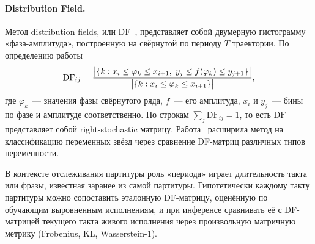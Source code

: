 \paragraph*{Distribution Field.} Метод distribution
fields, или DF~\cite{SevillaLaraDF2012}, представляет собой
двумерную гистограмму «фаза-амплитуда», построенную на
свёрнутой по периоду $T$ траектории. По определению
работы~\cite{SevillaLaraDF2012}
\begin{equation}
\mathrm{DF}_{ij} = \frac{\bigl|\{k : x_i\le \varphi_k\le x_{i+1},\;
                                    y_j\le f(\varphi_k)\le y_{j+1}\}\bigr|}
                        {\bigl|\{k : x_i\le \varphi_k\le x_{i+1}\}\bigr|},
\eqlab{df-def}
\end{equation}
где $\varphi_k$~--- значения фазы свёрнутого ряда, $f$~--- его
амплитуда, $x_i$ и $y_j$~--- бины по фазе и амплитуде
соответственно. По строкам $\sum_j \mathrm{DF}_{ij}=1$, то есть
$\mathrm{DF}$ представляет собой right-stochastic матрицу.
Работа~\cite{Johnston2020} расширила метод на классификацию
переменных звёзд через сравнение DF-матриц различных типов
переменности.

В контексте отслеживания партитуры роль «периода» играет
длительность такта или фразы, известная заранее из самой
партитуры. Гипотетически каждому такту партитуры можно
сопоставить эталонную DF-матрицу, оценённую по обучающим
выровненным исполнениям, и при инференсе сравнивать её с
DF-матрицей текущего такта живого исполнения через
произвольную матричную метрику (Frobenius, KL,
Wasserstein-1).

